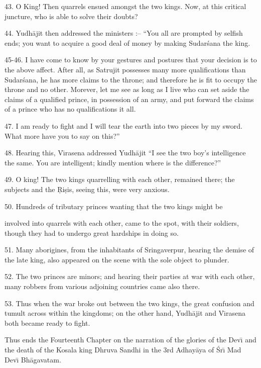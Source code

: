 43. O King! Then quarrels ensued amongst the two kings. Now, at this critical juncture, who is able to solve their doubts?

44. Yudh\=ajit then addressed the ministers :-- ``You all are prompted by selfish ends; you want to acquire a good deal of money by making Sudar\'sana the king.

45-46. I have come to know by your gestures and postures that your decision is to the above affect. After all, as Satrujit possesses many more qualifications than Sudar\'sana, he has more claims to the throne; and therefore he is fit to occupy the throne and no other. Morever, let me see as long as I live who can set aside the claims of a qualified prince, in possession of an army, and put forward the claims of a prince who has no qualifications it all.

47. I am ready to fight and I will tear the earth into two pieces by my sword. What more have you to say on this?''

48. Hearing this, V\={\i}rasena addressed Yudh\=ajit ``I see the two boy's intelligence the same. You are intelligent; kindly mention where is the difference?''

49. O king! The two kings quarrelling with each other, remained there; the subjects and the \d{R}i\d{s}is, seeing this, were very anxious.

50. Hundreds of tributary princes wanting that the two kings might be

involved into quarrels with each other, came to the spot, with their soldiers, though they had to undergo great hardships in doing so.

51. Many aborigines, from the inhabitants of Sringaverpur, hearing the demise of the late king, also appeared on the scene with the sole object to plunder.

52. The two princes are minors; and hearing their parties at war with each other, many robbers from various adjoining countries came also there.

53. Thus when the war broke out between the two kings, the great confusion and tumult across within the kingdoms; on the other hand, Yudh\=ajit and V\={\i}rasena both became ready to fight.

Thus ends the Fourteenth Chapter on the narration of the glories of the Dev\={\i} and the death of the Kosala king Dhruva Sandhi in the 3rd Adhay\=aya of \'Sr\={\i} Mad Dev\={\i} Bh\=agavatam.



